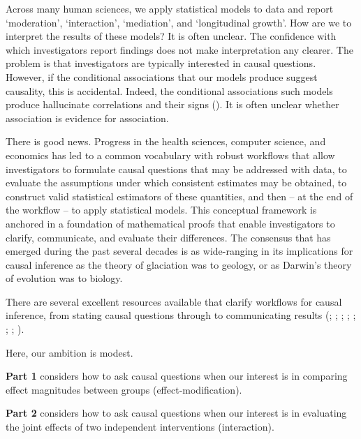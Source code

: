 \documentclass[
  single column]{article}
\begin{document}
Across many human sciences, we apply statistical models to data and
report `moderation', `interaction', `mediation', and `longitudinal
growth'. How are we to interpret the results of these models? It is
often unclear. The confidence with which investigators report findings
does not make interpretation any clearer. The problem is that
investigators are typically interested in causal questions. However, if
the conditional associations that our models produce suggest causality,
this is accidental. Indeed, the conditional associations such models
produce hallucinate correlations and their signs
(). It is
often unclear whether association is evidence for association.

There is good news. Progress in the health sciences, computer science,
and economics has led to a common vocabulary with robust workflows that
allow investigators to formulate causal questions that may be addressed
with data, to evaluate the assumptions under which consistent estimates
may be obtained, to construct valid statistical estimators of these
quantities, and then -- at the end of the workflow -- to apply
statistical models. This conceptual framework is anchored in a
foundation of mathematical proofs that enable investigators to clarify,
communicate, and evaluate their differences. The consensus that has
emerged during the past several decades is as wide-ranging in its
implications for causal inference as the theory of glaciation was to
geology, or as Darwin's theory of evolution was to biology.

There are several excellent resources available that clarify workflows
for causal inference, from stating causal questions through to
communicating results (; ;
;
;
;
; ; ).

Here, our ambition is modest.

\textbf{Part 1} considers how to ask causal questions when our interest
is in comparing effect magnitudes between groups (effect-modification).

\textbf{Part 2} considers how to ask causal questions when our interest
is in evaluating the joint effects of two independent interventions
(interaction).
\end{document}
